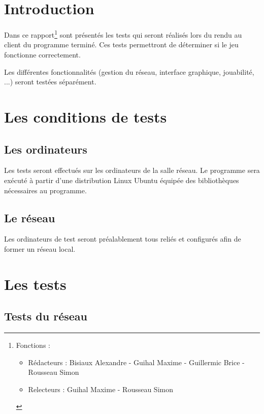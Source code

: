 \section*{Introduction}

Dans ce rapport\footnote{Fonctions :
\begin{itemize}
\item Rédacteurs : Bisiaux Alexandre - Guihal Maxime - Guillermic Brice - Rousseau Simon
\item Relecteurs : Guihal Maxime - Rousseau Simon
\end{itemize}
} sont présentés les tests qui seront réalisés lors du rendu au client du programme terminé. Ces tests permettront de déterminer si le jeu fonctionne correctement.

\vspace{0.5cm}

Les différentes fonctionnalités (gestion du réseau, interface graphique, jouabilité, ...) seront testées séparément.

\newpage

\section{Les conditions de tests}


\subsection{Les ordinateurs}

Les tests seront effectués sur les ordinateurs de la salle réseau. Le programme sera exécuté à partir d'une distribution Linux Ubuntu équipée des bibliothèques nécessaires au programme.

\subsection{Le réseau}

Les ordinateurs de test seront préalablement tous reliés et configurés afin de former un réseau local.


\section{Les tests}

\subsection{Tests du réseau}

